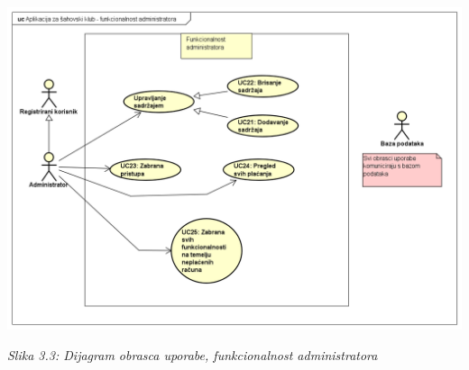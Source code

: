\documentclass{article}
\begin{document}
		\includegraphics[width=\columnwidth]{administrator_uc_dijagram}
		\begin{center}
			\textit{Slika 3.3: Dijagram obrasca uporabe, funkcionalnost administratora}
		\end{center}
		\eject
		
\end{document}
